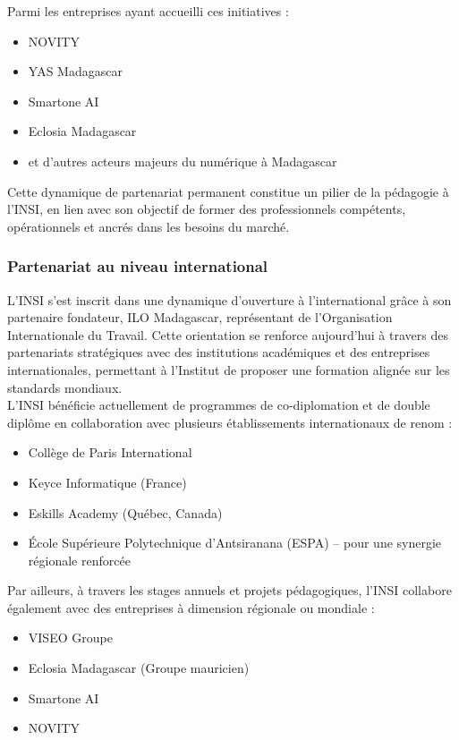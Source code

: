 \documentclass[a4paper,12pt, oneside]{article}
\begin{document}
Parmi les entreprises ayant accueilli ces initiatives :
\begin{itemize}
    \item NOVITY
    \item YAS Madagascar
    \item Smartone AI
    \item Eclosia Madagascar
    \item et d'autres acteurs majeurs du numérique à Madagascar
\end{itemize}

Cette dynamique de partenariat permanent constitue un pilier de la pédagogie à l’INSI, en lien avec son objectif de former des professionnels compétents, opérationnels et ancrés dans les besoins du marché.\\

\subsubsection{Partenariat au niveau international} 
L’INSI s’est inscrit dans une dynamique d’ouverture à l’international grâce à son partenaire fondateur, ILO Madagascar, représentant de l’Organisation Internationale du Travail. Cette orientation se renforce aujourd’hui à travers des partenariats stratégiques avec des institutions académiques et des entreprises internationales, permettant à l’Institut de proposer une formation alignée sur les standards mondiaux.\\

L’INSI bénéficie actuellement de programmes de co-diplomation et de double diplôme en collaboration avec plusieurs établissements internationaux de renom :
\begin{itemize}
    \item Collège de Paris International
    \item Keyce Informatique (France)
    \item Eskills Academy (Québec, Canada)
    \item École Supérieure Polytechnique d’Antsiranana (ESPA) – pour une synergie régionale renforcée
\end{itemize}

Par ailleurs, à travers les stages annuels et projets pédagogiques, l’INSI collabore également avec des entreprises à dimension régionale ou mondiale :
\begin{itemize}
    \item VISEO Groupe
    \item Eclosia Madagascar (Groupe mauricien)
    \item Smartone AI
    \item NOVITY
\end{itemize}
\end{document}
